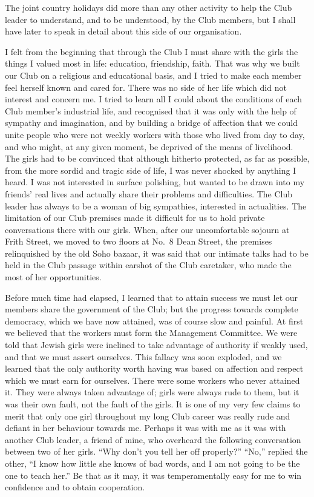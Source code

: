 The joint country holidays did more than any other
activity to help the Club leader to understand, and to be
understood, by the Club members, but I shall have later
to speak in detail about this side of our organisation.

I felt from the beginning that through the Club I
must share with the girls the things I valued most in life:
education, friendship, faith. That was why we built our
Club on a religious and educational basis, and I tried to
make each member feel herself known and cared for.
There was no side of her life which did not interest and
concern me. I tried to learn all I could about the conditions
of each Club member’s industrial life, and recognised
that it was only with the help of sympathy and
imagination, and by building a bridge of affection that
we could unite people who were not weekly workers with
those who lived from day to day, and who might, at any
given moment, be deprived of the means of livelihood.
The girls had to be convinced that although hitherto protected,
as far as possible, from the more sordid and tragic
side of life, I was never shocked by anything I heard.
I was not interested in surface polishing, but wanted to
be drawn into my friends’ real lives and actually share
their problems and difficulties. The Club leader has
always to be a woman of big sympathies, interested
in actualities. The limitation of our Club premises made
it difficult for us to hold private conversations there with
our girls. When, after our uncomfortable sojourn at
Frith Street, we moved to two floors at No.\ 8 Dean
Street, the premises relinquished by the old Soho bazaar,
it was said that our intimate talks had to be held in the
Club passage within earshot of the Club caretaker, who
made the most of her opportunities.

Before much time had elapsed, I learned that to attain
success we must let our members share the government
of the Club; but the progress towards complete
democracy, which we have now attained, was of course
slow and painful. At first we believed that the workers
must form the Management Committee. We were told
that Jewish girls were inclined to take advantage of
authority if weakly used, and that we must assert ourselves. This fallacy was soon exploded, and we learned
that the only authority worth having was based on
affection and respect which we must earn for ourselves. There
were some workers who never attained it. They were
always taken advantage of; girls were always rude to
them, but it was their own fault, not the fault of the
girls. It is one of my very few claims to merit that only
one girl throughout my long Club career was really rude
and defiant in her behaviour towards me. Perhaps it
was with me as it was with another Club leader, a friend
of mine, who overheard the following conversation
between two of her girls. “Why don’t you tell her off
properly?” “No,” replied the other, “I know how little
she knows of bad words, and I am not going to be the
one to teach her.” Be that as it may, it was temperamentally
easy for me to win confidence and to obtain cooperation.

